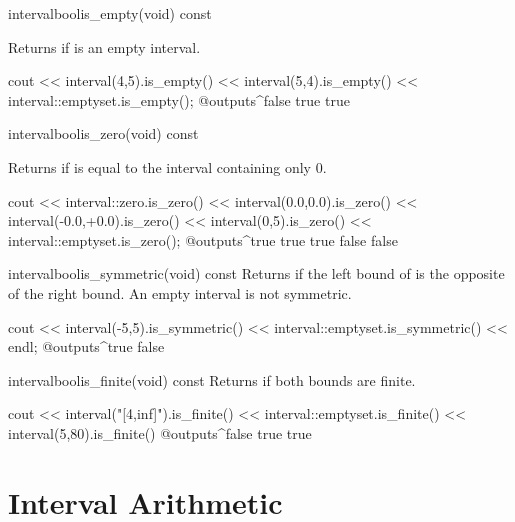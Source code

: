 \documentclass{manual}
\newcommand{\itv}[2]{\ensuremath{[#1,\,#2]}}
\let\emptyset=\varnothing
\begin{document}
\begin{defmethod}{interval}{bool}{is\_empty}{(void) const}
  \begin{operation}
    \op{$\code{self} = \emptyset$}
  \end{operation}
  Returns  if  is an empty interval.
  \begin{example}
cout << interval(4,5).is_empty()
     << interval(5,4).is_empty()
     << interval::emptyset.is_empty();
@outputs^false true true~
  \end{example}
\end{defmethod}

\begin{defmethod}{interval}{bool}{is\_zero}{(void) const}
  \begin{operation}
    \op{$\code{self} = \itv{0}{0}$}
  \end{operation}
  Returns  if  is equal to the interval containing only $0$.
  \begin{example}
cout << interval::zero.is_zero()
     << interval(0.0,0.0).is_zero()
     << interval(-0.0,+0.0).is_zero()
     << interval(0,5).is_zero()
     << interval::emptyset.is_zero();
@outputs^true true true false false~
  \end{example}
\end{defmethod}

\begin{defmethod}{interval}{bool}{is\_symmetric}{(void) const}
  Returns  if the left bound of  is the opposite of the
  right bound. An empty interval is not symmetric.

\begin{example}
cout << interval(-5,5).is_symmetric()
     << interval::emptyset.is_symmetric() << endl;
@outputs^true false~
\end{example}
\end{defmethod}

\begin{defmethod}{interval}{bool}{is\_finite}{(void) const}
  Returns  if both bounds are finite.

\begin{example}
cout << interval("[4,inf]").is_finite()
     << interval::emptyset.is_finite()
     << interval(5,80).is_finite()
@outputs^false true true~
\end{example}
\end{defmethod}

\chapter{Interval Arithmetic}
\end{document}
